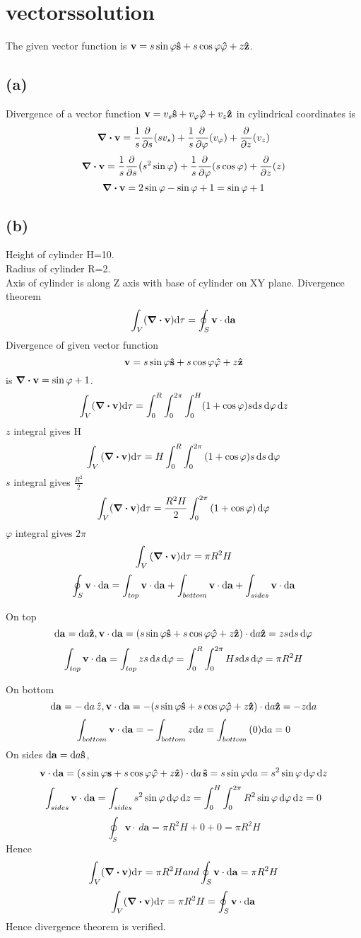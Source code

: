 \section*{vectorssolution}
The given vector function is \(
\vb{v}=s\sin{\varphi}\vu{s}+s\cos{\varphi}\vu{\varphi}+z\vu{z}
\).
\subsection*{(a)}
Divergence of a vector function 
\(\vb{v}=v_s\vu{s}+v_{\varphi}\vu{\varphi}+v_z\vu{z} \) in cylindrical coordinates is \[\div{\vb{v}}=\frac{1}{s}\pdv{s}(sv_s)+\frac{1}{s}\pdv{\varphi}(v_{\varphi})+\pdv{z}(v_z)\]
\[\div{\vb{v}}=\frac{1}{s}\pdv{s}(s^2\sin{\varphi})+\frac{1}{s}\pdv{\varphi}(s\cos{\varphi})+\pdv{z}(z)\]
\[\div{\vb{v}}=2\sin{\varphi}-\sin{\varphi}+1=\sin{\varphi}+1\]
\subsection*{(b)}
Height of cylinder H=10.\\
Radius of cylinder R=2.\\
Axis of cylinder is along Z axis with base of cylinder on XY plane.
Divergence theorem \[\int_{V}(\div{\vb{v}})\dd\tau=\oint_{S}{\vb{v}\cdot\dd{\vb{a}}}\]
Divergence of given vector function \[\vb{v}=s\sin{\varphi}\vu{s}+s\cos{\varphi}\vu{\varphi}+z\vu{z}\] is  \(\div{\vb{v}}=\sin{\varphi}+1\).
\[\int_{V}(\div{\vb{v}})\dd\tau=\int_{0}^{R}\int_{0}^{2\pi}\int_{0}^{H}(1+\cos{\varphi})s\dd s\dd{\varphi}\dd z
\]
$z$ integral gives H
\[\int_{V}{(\div{\vb{v}})\dd\tau}=H\int_{0}^{R}\int_{0}^{2\pi}{(1+\cos{\varphi})s\dd{s}\dd{\varphi}}
\]
$s$ integral gives \(\frac{R^2}{2}\)
\[\int_{V}(\div{\vb{v}})\dd\tau=\frac{R^2H}{2}\int_{0}^{2\pi}{(1+\cos{\varphi})\dd{\varphi}}\]
\(\varphi\) integral gives \(2\pi\)
\[\int_{V}{(\div{\vb{v}})\dd\tau}=\pi{R^2H}\]
\[
\oint_{S}\vb{v}\cdot\dd{\vb{a}}=\int_{top}\vb{v}\cdot\dd\vb{a}+\int_{bottom}\vb{v}\cdot\dd\vb{a}+\int_{sides}\vb{v}\cdot\dd\vb{a}\]

On top \[\dd\vb{a}=\dd a\vu{z}, \vb{v}\cdot\dd\vb{a}=(s\sin{\varphi}\vu{s}+s\cos{\varphi}\vu{\varphi}+z\vu{z})\cdot\dd a\vu{z}=zs\dd s\dd{\varphi}\]
\[\int_{top}\vb{v}\cdot\dd\vb{a}=\int_{top}zs\dd{s}\dd{\varphi}=\int_{0}^{R}\int_{0}^{2\pi}Hs\dd s\dd{\varphi}=\pi{R^2H}\]

On bottom \[\dd\vb{a}=-\dd{a}\hat{z}, \vb{v}\cdot\dd\mathbf{a}=-(s\sin{\varphi}\vu{s}+s\cos{\varphi}\vu{\varphi}+z\vu{z})\cdot\dd a\vu{z}=-z \dd a\]
\[\int_{bottom}\vb{v}\cdot\dd\vb{a}=-\int_{bottom}{z\dd a}=\int_{bottom}{(0)\dd a}=0\]
On sides \(\dd{\vb{a}}=\dd a\vu{s}\), \[\vb{v}\cdot\dd{\vb{a}}=(s\sin{\varphi}\vb{s}+s\cos{\varphi}\vu{\varphi}+z\vu{z})\cdot\dd a\,\vu{s}=s\sin{\varphi}\dd a=s^2\sin{\varphi}\dd{\varphi}\dd z\]
\[\int_{sides}\vb{v}\cdot\dd\vb{a}=\int_{sides}s^2\sin{\varphi}\dd{\varphi}\dd{z}=\int_{0}^{H}\int_{0}^{2\pi}R^2\sin{\varphi}\dd{\varphi}\dd{z}=0\]
\[\oint_{S}{\mathbf{v}\cdot\,d{\mathbf{a}}}=\pi{R^2H}+0+0=\pi{R^2H}\]
Hence \[\int_{V}(\div{\vb{v}})\dd\tau=\pi{R^2H} and \oint_{S}\vb{v}\cdot\dd\vb{a}=\pi{R^2H}\]
\[\int_{V}(\div{\vb{v}})\dd\tau=\pi{R^2H}=\oint_{S}\vb{v}\cdot\dd{\vb{a}}\]
Hence divergence theorem is verified.
